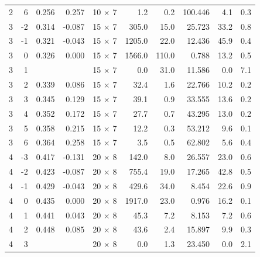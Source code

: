 \begin{table}[htbp]
\begin{tabular}{rrrrcrrrrr}
  2        & 6        & 0.256    & 0.257    & 10 $\times$ 7 & 1.2      & 0.2      & 100.446   & 4.1      & 0.3 \\
  3        & -2       & 0.314    & -0.087   & 15 $\times$ 7 & 305.0    & 15.0     & 25.723    & 33.2     & 0.8 \\
  3        & -1       & 0.321    & -0.043   & 15 $\times$ 7 & 1205.0   & 22.0     & 12.436    & 45.9     & 0.4 \\
  3        & 0        & 0.326    & 0.000    & 15 $\times$ 7 & 1566.0   & 110.0    & 0.788     & 13.2     & 0.5 \\
  3        & 1        &          &          & 15 $\times$ 7 & 0.0      & 31.0     & 11.586    & 0.0      & 7.1 \\
  3        & 2        & 0.339    & 0.086    & 15 $\times$ 7 & 32.4     & 1.6      & 22.766    & 10.2     & 0.2 \\
  3        & 3        & 0.345    & 0.129    & 15 $\times$ 7 & 39.1     & 0.9      & 33.555    & 13.6     & 0.2 \\
  3        & 4        & 0.352    & 0.172    & 15 $\times$ 7 & 27.7     & 0.7      & 43.295    & 13.0     & 0.2 \\
  3        & 5        & 0.358    & 0.215    & 15 $\times$ 7 & 12.2     & 0.3      & 53.212    & 9.6      & 0.1 \\
  3        & 6        & 0.364    & 0.258    & 15 $\times$ 7 & 3.5      & 0.5      & 62.802    & 5.6      & 0.4 \\
  4        & -3       & 0.417    & -0.131   & 20 $\times$ 8 & 142.0    & 8.0      & 26.557    & 23.0     & 0.6 \\
  4        & -2       & 0.423    & -0.087   & 20 $\times$ 8 & 755.4    & 19.0     & 17.265    & 42.8     & 0.5 \\
  4        & -1       & 0.429    & -0.043   & 20 $\times$ 8 & 429.6    & 34.0     & 8.454     & 22.6     & 0.9 \\
  4        & 0        & 0.435    & 0.000    & 20 $\times$ 8 & 1917.0   & 23.0     & 0.976     & 16.2     & 0.1 \\
  4        & 1        & 0.441    & 0.043    & 20 $\times$ 8 & 45.3     & 7.2      & 8.153     & 7.2      & 0.6 \\
  4        & 2        & 0.448    & 0.085    & 20 $\times$ 8 & 43.6     & 2.4      & 15.897    & 9.9      & 0.3 \\
  4        & 3        &          &          & 20 $\times$ 8 & 0.0      & 1.3      & 23.450    & 0.0      & 2.1 \\

\end{tabular}
\end{table}

